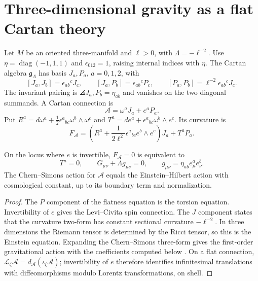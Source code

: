 \section{Three-dimensional gravity as a flat Cartan theory}
Let $M$ be an oriented three-manifold and $\ell>0$, with
$\Lambda=-\ell^{-2}$. Use $\eta=\operatorname{diag}(-1,1,1)$ and
$\epsilon_{012}=1$, raising internal indices with $\eta$.
The Cartan algebra $\mathfrak g_\Lambda$ has basis $J_a,P_a$, $a=0,1,2$, with
\[
 [J_a,J_b]=\epsilon_{ab}{}^cJ_c,
 \qquad [J_a,P_b]=\epsilon_{ab}{}^cP_c,
 \qquad [P_a,P_b]=\ell^{-2}\epsilon_{ab}{}^cJ_c.
\]
The invariant pairing is $\angles{J_a,P_b}=\eta_{ab}$ and vanishes on the two diagonal summands.  A Cartan connection is
\[
 \mathcal A=\omega^aJ_a+e^aP_a.
\]
Put $R^a=d\omega^a+\tfrac12\epsilon^a{}_{bc}\omega^b\wedge\omega^c$
and $T^a=de^a+\epsilon^a{}_{bc}\omega^b\wedge e^c$. Its curvature is
\[
 F_{\mathcal A}
 =\left(R^a+\frac1{2\ell^2}\epsilon^a{}_{bc}e^b\wedge e^c\right)J_a
 +T^aP_a.
\]

\begin{theorem}
On the locus where $e$ is invertible, $F_{\mathcal A}=0$ is equivalent to
\[
 T^a=0,
 \qquad
 G_{\mu\nu}+\Lambda g_{\mu\nu}=0,
 \qquad
 g_{\mu\nu}=\eta_{ab}e^a_\mu e^b_\nu.
\]
The Chern--Simons action for $\mathcal A$ equals the Einstein--Hilbert action with cosmological constant, up to its boundary term and normalization.
\end{theorem}
\begin{proof}
The $P$ component of the flatness equation is the torsion equation.  Invertibility of $e$ gives the Levi--Civita spin connection.  The $J$ component states that the curvature two-form has constant sectional curvature $-\ell^{-2}$.  In three dimensions the Riemann tensor is determined by the Ricci tensor, so this is the Einstein equation.  Expanding the Chern--Simons three-form gives the first-order gravitational
action with the coefficients computed below
\cite{AchucarroTownsend,Witten3DGravity}. On a flat connection,
$\mathcal L_\zeta\mathcal A=d_{\mathcal A}(\iota_\zeta\mathcal A)$;
invertibility of $e$ therefore identifies infinitesimal translations with
diffeomorphisms modulo Lorentz transformations, on shell.
\end{proof}

